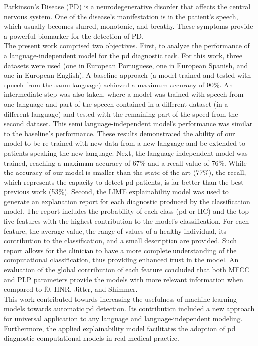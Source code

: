 Parkinson’s Disease (PD) is a neurodegenerative disorder that affects the central nervous system. One of the disease's manifestation is in the patient’s speech, which usually becomes slurred, monotonic, and breathy. These symptoms provide a powerful biomarker for the detection of PD. \\
The present work comprised two objectives. First, to analyze the performance of a language-independent model for the \gls{pd} diagnostic task. For this work, three datasets were used (one in European Portuguese, one in European Spanish, and one in European English). A baseline approach (a model trained and tested with speech from the same language) achieved a maximum accuracy of 90\%. An intermediate step was also taken, where a model was trained with speech from one language and part of the speech contained in a different dataset (in a different language) and tested with the remaining part of the speed from the second dataset. This semi language-independent model's performance was similar to the baseline's performance. These results demonstrated the ability of our model to be re-trained with new data from a new language and be extended to patients speaking the new language. Next, the language-independent model was trained, reaching a maximum accuracy of 67\% and a recall value of 76\%. While the accuracy of our model is smaller than the state-of-the-art (77\%), the recall, which represents the capacity to detect \gls{pd} patients, is far better than the best previous work (53\%). Second, the LIME explainability model was used to generate an explanation report for each diagnostic produced by the classification model. The report includes the probability of each class (\gls{pd} or HC) and the top five features with the highest contribution to the model's classification. For each feature, the average value, the range of values of a healthy individual, its contribution to the classification, and a small description are provided. Such report allows for the clinician to have a more complete understanding of the computational classification, thus providing enhanced trust in the model. An evaluation of the global contribution of each feature concluded that both MFCC and PLP parameters provide the models with more relevant information when compared to \gls{f0}, HNR, Jitter, and Shimmer.\\
This work contributed towards increasing the usefulness of machine learning models towards automatic \gls{pd} detection. Its contribution included a new approach for universal application to any language and language-independent modeling. Furthermore, the applied explainability model facilitates the adoption of \gls{pd} diagnostic computational models in real medical practice.

